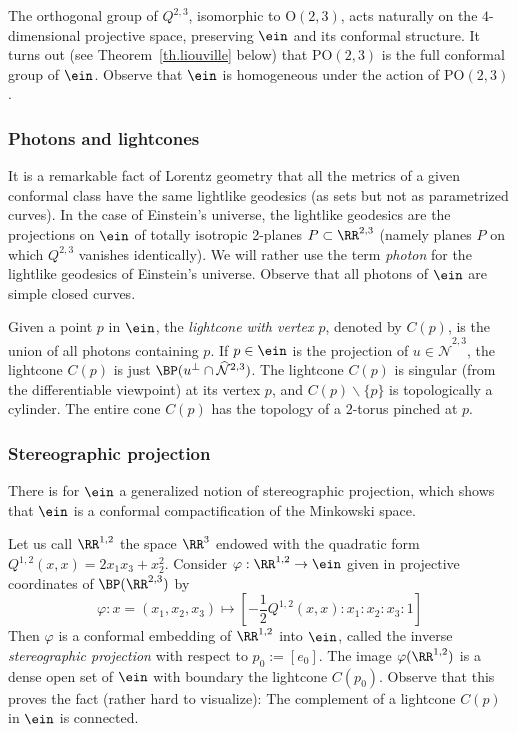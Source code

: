 The orthogonal group of $Q^{2,3}$, isomorphic to $\mbox{O}(2,3)$, acts naturally on the $4$-dimensional projective space, preserving $\ein$ and its conformal structure. It turns out (see Theorem~\ref{th.liouville} below) that $\mbox{PO}(2,3)$ is the full conformal group of $\ein$. Observe that $\ein$ is homogeneous under the action of $\mbox{PO}(2,3)$.

\subsubsection{Photons and lightcones}
It is a remarkable fact of Lorentz geometry that all the metrics of a given conformal class have the same lightlike geodesics (as sets but not as parametrized curves). In the case of Einstein's universe, the lightlike geodesics are the projections on $\ein$ of totally isotropic 2-planes $P \subset \RR^{2,3}$ (namely planes $P$ on which $Q^{2,3}$ vanishes identically). We will rather use the term \emph{photon} for the lightlike geodesics of Einstein's universe. Observe that all photons of $\ein$ are simple closed curves.

Given a point $p$ in $\ein$, the \emph{lightcone with vertex $p$}, denoted by $C(p)$, is the union of all photons containing $p$. If $p \in \ein$ is the projection of $u \in \mathcal{\widehat{N}}^{2,3}$, the lightcone $C(p)$ is just $\BP({ u}^{\bot} \cap \mathcal{\widehat{N}}^{2,3})$. The lightcone $C(p)$ is singular (from the differentiable viewpoint) at its vertex $p$, and $C(p) \backslash \{p \}$ is topologically a cylinder. The entire cone $C(p)$ has the topology of a $2$-torus pinched at $p$.


\subsubsection{Stereographic projection}\label{sec.stereographic}
There is for $\ein$ a generalized notion of stereographic projection, which shows that $\ein$ is a conformal compactification of the Minkowski space.


Let us call $\RR^{1,2}$ the space $\RR^3$ endowed with the quadratic form $Q^{1,2}(x,x)=2x_1x_3+x_2^2$. Consider $\varphi : \RR^{1,2} \to \ein$ given in projective coordinates of $\BP(\RR^{2,3})$ by
\begin{equation}\label{eq.stereographic}
\varphi: x=(x_1,x_2,x_3) \mapsto \left[-\frac{1}{2}Q^{1,2}(x,x): x_1 : x_2 : x_3 : 1\right]
\end{equation}
Then $\varphi$ is a conformal embedding of $\RR^{1,2}$ into $\ein$, called the inverse \emph{stereographic projection } with respect to $p_0:=[e_0]$. The image $\varphi(\RR^{1,2})$ is a dense open set of $\ein$ with boundary the lightcone $C(p_0)$. Observe that this proves the fact (rather hard to visualize): The complement of a lightcone $C(p)$ in $\ein$ is connected.

